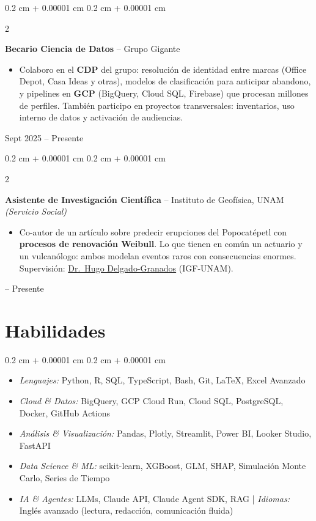 \documentclass[10pt, letterpaper]{article}
\newenvironment{highlights}{
    \begin{itemize}[
        topsep=0.05 cm,
        parsep=0.05 cm,
        partopsep=0pt,
        itemsep=0pt,
        leftmargin=0.4 cm + 10pt
    ]
}{
    \end{itemize}
}
\newenvironment{highlightsforbulletentries}{
    \begin{itemize}[
        topsep=0.05 cm,
        parsep=0.05 cm,
        partopsep=0pt,
        itemsep=0pt,
        leftmargin=10pt
    ]
}{
    \end{itemize}
}
\newenvironment{onecolentry}{
    \begin{adjustwidth}{
        0.2 cm + 0.00001 cm
    }{
        0.2 cm + 0.00001 cm
    }
}{
    \end{adjustwidth}
}
\newenvironment{twocolentry}[2][]{
    \onecolentry
    \def\secondColumn{#2}
    \setcolumnwidth{\fill, 4.5 cm}
    \begin{paracol}{2}
}{
    \switchcolumn \raggedleft \secondColumn
    \end{paracol}
    \endonecolentry
}
\let\hrefWithoutArrow\href
\renewcommand{\href}[2]{\hrefWithoutArrow{#1}{\ifthenelse{\equal{#2}{}}{ }{#2 }\raisebox{.15ex}{\footnotesize \faExternalLink*}}}
\begin{document}
        \begin{twocolentry}{
            Sept 2025 -- Presente
        }
            \textbf{Becario Ciencia de Datos} -- Grupo Gigante
            \begin{highlights}
                \item Colaboro en el \textbf{CDP} del grupo: resolución de identidad entre marcas (Office Depot, Casa Ideas y otras), modelos de clasificación para anticipar abandono, y pipelines en \textbf{GCP} (BigQuery, Cloud SQL, Firebase) que procesan millones de perfiles. También participo en proyectos transversales: inventarios, uso interno de datos y activación de audiencias.
            \end{highlights}
        \end{twocolentry}

        \vspace{0.10 cm}

        \begin{twocolentry}{
            2025 -- Presente
        }
            \textbf{Asistente de Investigación Científica} -- Instituto de Geofísica, UNAM \textit{(Servicio Social)}
            \begin{highlights}
                \item Co-autor de un artículo sobre predecir erupciones del Popocatépetl con \textbf{procesos de renovación Weibull}. Lo que tienen en común un actuario y un vulcanólogo: ambos modelan eventos raros con consecuencias enormes. Supervisión: \hrefWithoutArrow{https://scholar.google.com/citations?user=lDD0DZQAAAAJ}{Dr.\ Hugo Delgado-Granados} (IGF-UNAM).
            \end{highlights}
        \end{twocolentry}


    \section{Habilidades}

\begin{onecolentry}
    \begin{highlightsforbulletentries}
        \item \textit{Lenguajes:} Python, R, SQL, TypeScript, Bash, Git, \LaTeX, Excel Avanzado
        \item \textit{Cloud \& Datos:} BigQuery, GCP Cloud Run, Cloud SQL, PostgreSQL, Docker, GitHub Actions
        \item \textit{Análisis \& Visualización:} Pandas, Plotly, Streamlit, Power BI, Looker Studio, FastAPI
        \item \textit{Data Science \& ML:} scikit-learn, XGBoost, GLM, SHAP, Simulación Monte Carlo, Series de Tiempo
        \item \textit{IA \& Agentes:} LLMs, Claude API, Claude Agent SDK, RAG | \textit{Idiomas:} Inglés avanzado (lectura, redacción, comunicación fluida)
    \end{highlightsforbulletentries}
\end{onecolentry}
\end{document}
